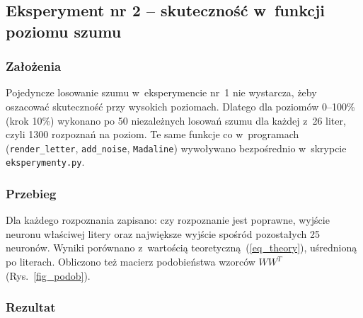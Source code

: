 \documentclass[12pt]{article}
\begin{document}
\newpage
\subsection{Eksperyment nr 2 -- skuteczność w~funkcji poziomu szumu}

\subsubsection{Założenia}

Pojedyncze losowanie szumu w~eksperymencie nr~1 nie wystarcza, żeby oszacować
skuteczność przy wysokich poziomach. Dlatego dla poziomów 0--100\% (krok 10\%) wykonano
po 50 niezależnych losowań szumu dla każdej z~26 liter, czyli 1300 rozpoznań na poziom.
Te same funkcje co w~programach (\texttt{render\_letter}, \texttt{add\_noise},
\texttt{Madaline}) wywoływano bezpośrednio w~skrypcie \texttt{eksperymenty.py}.

\subsubsection{Przebieg}

Dla każdego rozpoznania zapisano: czy rozpoznanie jest poprawne, wyjście neuronu właściwej
litery oraz największe wyjście spośród pozostałych 25 neuronów. Wyniki porównano z~wartością
teoretyczną~(\ref{eq_theory}), uśrednioną po literach. Obliczono też macierz podobieństwa
wzorców $W W^{T}$ (Rys.~\ref{fig_podob}).

\subsubsection{Rezultat}
\end{document}
